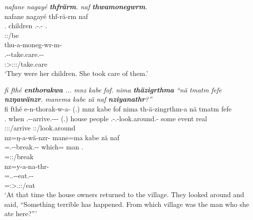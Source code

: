 \begin{exe}
	\ex \textit{nafane nagayé \textbf{thfrärm}. naf \textbf{thwamonegwrm}.}\\
	\glll nafane nagayé thf-rä-rm naf\\
	\Tsg{}.\Poss{} children \Stnsg.\Betatwo-\Cop.\Ndu-\Dur{} \Tsg{}.\Erg{}\\
	{} {} \footnotesize{\Stpl:\Pst:\Dur/be} {}\\
	\sn
	\glll thu-a-moneg-wr-m-\Zero{}\\
	\Stnsg.\Betaone-\Vc-take.care.\Ext-\Ndu-\Dur\\
	\footnotesize{\Stsg:\Sbj>\Stpl:\Obj:\Pst:\Dur/take.care}\\
	\trans `They were her children. She took care of them.' 
	\label{ex006}
\end{exe}
\begin{exe}
	\ex \emph{fi fthé \textbf{enthorakwa} ... mnz kabe fof. nima \textbf{thäzigrthma} ``nä tmatm fefe \textbf{nzŋawänzr}. manema kabe zä naf \textbf{nziyanathr}?''}\\
	\glll fi fthé e-n-thorak-w-a-\Zero{} (.) mnz kabe fof nima th-ä-zingrthm-a nä tmatm fefe\\
	\Third{}.\Abs{} when \Stnsg.\Alph-\Venit-arrive.\Ext-\Ndu-\Pst-\Stsg{} (.) house people \Emph{} \Quot{} \Stnsg.\Gam-\Vc.\Ndu-look.around.\Rs-\Pst{} some event real\\
	{} {} \footnotesize{\Stpl:\Pst:\Ipfv:\Venit/arrive} {} {} {} {} {} \footnotesize{\Stpl:\Pst:\Pfv/look.around} {} {} {}\\
	\sn
	\glll nz=ŋ-a-wä-nzr-\Zero{} mane=ma kabe zä naf\\
	\Immpst{}=\M.\Alph-\Vc-break.\Ext-\Ndu-\Stsg{} which=\Char{} man \Prox{} \Tsg{}.\Erg{}\\
	\footnotesize{\Immpst{}=\Stsg:\Nonpast:\Ipfv/break} {} {} {} {}\\
	\sn
	\glll nz=y-a-na-thr-\Zero{}\\
	\Immpst{}=\Tsg.\Masc.\Alph-\Vc-eat.\Ext-\Ndu-\Stsg{}\\
	 \footnotesize{\Immpst{}=\Stsg:\Sbj>\Tsg.\Masc:\Obj:\Nonpast/eat}\\
	\trans `At that time the house owners returned to the village. They looked around and said, ``Something terrible has happened. From which village was the man who she ate here?''' 
	\label{ex007}
\end{exe}

